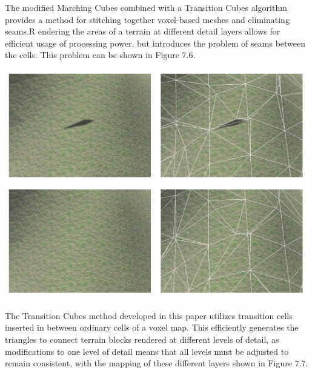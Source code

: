 \documentclass[10pt]{report}
\begin{document}
		The modified Marching Cubes combined with a Transition Cubes algorithm provides a method for stitching together voxel-based meshes and eliminating seams.R endering the areas of a terrain at different detail layers allows for efficient usage of processing power, but introduces the problem of seams between the cells. This problem can be shown in Figure 7.6. 
		
		\begin{minipage}{\textwidth}
			\centering
			\includegraphics[scale=.75]{voxel-seam}
			\label{fig:fig10}
		\end{minipage}
		
		The Transition Cubes method developed in this paper utilizes transition cells inserted in between ordinary cells of a voxel map. This efficiently generates the triangles to connect terrain blocks rendered at different levels of detail, as modifications to one level of detail means that all levels must be adjusted to remain consistent, with the mapping of these different layers shown in Figure 7.7.
		
\end{document}

